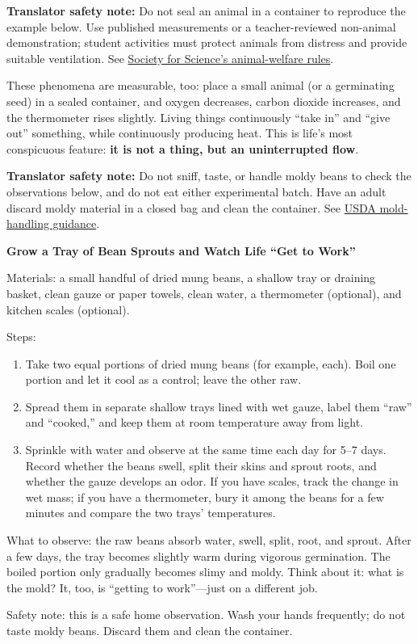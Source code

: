 \textbf{Translator safety note:} Do not seal an animal in a container to reproduce the example below. Use published measurements or a teacher-reviewed non-animal demonstration; student activities must protect animals from distress and provide suitable ventilation. See \href{https://www.societyforscience.org/isef/international-rules/vertebrate-animals/}{Society for Science's animal-welfare rules}.

These phenomena are measurable, too: place a small animal (or a germinating seed) in a sealed container, and oxygen decreases, carbon dioxide increases, and the thermometer rises slightly. Living things continuously ``take in'' and ``give out'' something, while continuously producing heat. This is life's most conspicuous feature: \textbf{it is not a thing, but an uninterrupted flow}.

\textbf{Translator safety note:} Do not sniff, taste, or handle moldy beans to check the observations below, and do not eat either experimental batch. Have an adult discard moldy material in a closed bag and clean the container. See \href{https://www.fsis.usda.gov/food-safety/safe-food-handling-and-preparation/food-safety-basics/molds-food-are-they-dangerous}{USDA mold-handling guidance}.

\begin{shiyan}
\textbf{Grow a Tray of Bean Sprouts and Watch Life ``Get to Work''}

Materials: a small handful of dried mung beans, a shallow tray or draining basket, clean gauze or paper towels, clean water, a thermometer (optional), and kitchen scales (optional).

Steps:
\begin{enumerate}[itemsep=1pt]
\item Take two equal portions of dried mung beans (for example,  each). Boil one portion and let it cool as a control; leave the other raw.
\item Spread them in separate shallow trays lined with wet gauze, label them ``raw'' and ``cooked,'' and keep them at room temperature away from light.
\item Sprinkle with water and observe at the same time each day for 5--7 days. Record whether the beans swell, split their skins and sprout roots, and whether the gauze develops an odor. If you have scales, track the change in wet mass; if you have a thermometer, bury it among the beans for a few minutes and compare the two trays' temperatures.
\end{enumerate}

What to observe: the raw beans absorb water, swell, split, root, and sprout. After a few days, the tray becomes slightly warm during vigorous germination. The boiled portion only gradually becomes slimy and moldy. Think about it: what is the mold? It, too, is ``getting to work''---just on a different job.

Safety note: this is a safe home observation. Wash your hands frequently; do not taste moldy beans. Discard them and clean the container.
\end{shiyan}

